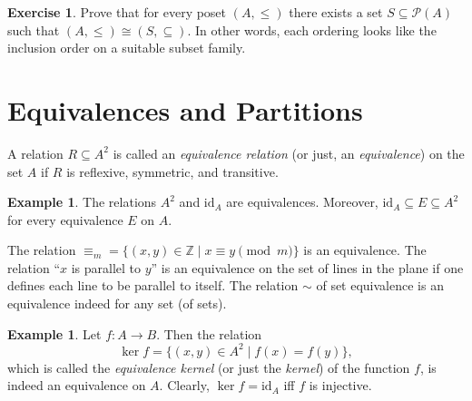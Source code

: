 \documentclass[12pt,notitlepage]{article}
\theoremstyle{plain}
\theoremstyle{definition}
\newtheorem{exc}[thm]{Exercise}
\newtheorem{exm}[thm]{Example}
\theoremstyle{plain}
\newcommand{\Z}{\mathbb{Z}}
\newcommand{\sbs}{\subseteq}
\newcommand{\mP}{\mathcal{P}}
\newcommand{\id}{\mathrm{id}}
\newcommand{\1}{\mathbf{1}}
\newcommand{\0}{\mathbf{0}}
\begin{document}
\begin{exc}
Prove that for every poset $(A, \leq)$ there exists a set $S \sbs \mP(A)$ such that $(A, \leq) \cong (S, {\sbs})$. In other words, each ordering looks like the inclusion order on a suitable subset family.
\end{exc}
 
\section{Equivalences and Partitions}

A relation $R \sbs A^2$ is called an \emph{equivalence relation} (or just, an \emph{equivalence}) on the set $A$ if $R$ is reflexive, symmetric, and transitive.

\begin{exm}
The relations $A^2$ and $\id_A$ are equivalences. Moreover, $\id_A \sbs E \sbs A^2$ for every equivalence $E$ on $A$.

The relation $\equiv_m = \{ (x,y) \in \Z \mid  x \equiv y \pmod m \}$ is an equivalence. The relation ``$x$ is parallel to $y$'' is an equivalence on the set of lines in the plane if one defines each line to be parallel to itself. The relation ${\sim}$ of set equivalence is an equivalence indeed for any set (of sets).
\end{exm}

\begin{exm}
Let $f\colon A \to B$. Then the relation $$\ker f = \{(x,y) \in A^2 \mid f(x) = f(y)\},$$ which is called the \emph{equivalence kernel} (or just the \emph{kernel}) of the function $f$, is indeed an equivalence on $A$. Clearly, $\ker f = \id_A$ iff $f$ is injective.
\end{exm}
\end{document}
